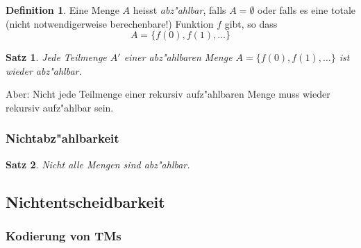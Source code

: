 \documentclass[german, 10pt, a4paper, twocolumn]{scrartcl}
\newtheorem{satz}{Satz}[section]
\theoremstyle{definition}
\newtheorem*{definition}{Definition}
\theoremstyle{example}
\begin{document}
\begin{definition}
	Eine Menge $A$ heisst \textit{abz"ahlbar}, falls $A=\emptyset$ oder falls es eine totale (nicht notwendigerweise berechenbare!) Funktion $f$ gibt, so dass
	\begin{displaymath}
		A = \{ f(0), f(1), \ldots \}
	\end{displaymath}
\end{definition}

\begin{satz}
	Jede Teilmenge $A'$ einer abz"ahlbaren Menge $A=\{ f(0), f(1), \ldots \}$ ist wieder abz"ahlbar.
\end{satz}

Aber: Nicht jede Teilmenge einer rekursiv aufz"ahlbaren Menge muss wieder rekursiv aufz"ahlbar sein.

\subsubsection{Nichtabz"ahlbarkeit}

\begin{satz}
	Nicht alle Mengen sind abz"ahlbar.
\end{satz}

\subsection{Nichtentscheidbarkeit}

\subsubsection{Kodierung von TMs}
\end{document}

